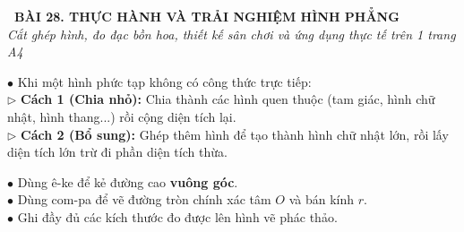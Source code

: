 \documentclass[14pt,a4paper,oneside]{extbook}
\begin{document}
\noindent
\begin{tcolorbox}[
  enhanced,
  colback=teal!8!white,
  colframe=teal!80!black,
  arc=3mm,
  boxrule=1.1pt,
  width=\linewidth,
  halign=center,
  top=2.2mm, bottom=2.2mm,
  left=3mm, right=3mm,
  drop fuzzy shadow
]
  {\large\bfseries\color{teal!95!black}\faBookmark\ BÀI 28. THỰC HÀNH VÀ TRẢI NGHIỆM HÌNH PHẲNG}\\[2pt]
  {\scriptsize\color{black!75}\itshape Cắt ghép hình, đo đạc bồn hoa, thiết kế sân chơi và ứng dụng thực tế trên 1 trang A4}
\end{tcolorbox}

\vspace{3.2mm}
\noindent
\begin{minipage}[t]{0.54\textwidth}
  \begin{tcolorbox}[
    enhanced,
    title={\footnotesize\bfseries\color{white}\faScissors\ 1. Nguyên lý phân chia và bảo toàn diện tích},
    colback=blue!2!white,
    colframe=blue!75!black,
    arc=2.5mm, boxrule=0.8pt, top=1.8mm, bottom=1.8mm, left=2.2mm, right=2.2mm
  ]
    \footnotesize
    $\bullet$ Khi một hình phức tạp không có công thức trực tiếp:\\
    $\triangleright$ \textbf{Cách 1 (Chia nhỏ):} Chia thành các hình quen thuộc (tam giác, hình chữ nhật, hình thang...) rồi cộng diện tích lại.\\
    $\triangleright$ \textbf{Cách 2 (Bổ sung):} Ghép thêm hình để tạo thành hình chữ nhật lớn, rồi lấy diện tích lớn trừ đi phần diện tích thừa.
  \end{tcolorbox}
\end{minipage}%
\hfill
\begin{minipage}[t]{0.44\textwidth}
  \begin{tcolorbox}[
    enhanced,
    title={\footnotesize\bfseries\color{white}\faPencilSquareO\ 2. Kỹ năng vẽ hình chuẩn},
    colback=teal!2!white,
    colframe=teal!75!black,
    arc=2.5mm, boxrule=0.8pt, top=1.8mm, bottom=1.8mm, left=2mm, right=2mm
  ]
    \footnotesize
    $\bullet$ Dùng ê-ke để kẻ đường cao \textbf{vuông góc}.\\
    $\bullet$ Dùng com-pa để vẽ đường tròn chính xác tâm $O$ và bán kính $r$.\\
    $\bullet$ Ghi đầy đủ các kích thước đo được lên hình vẽ phác thảo.
  \end{tcolorbox}
\end{minipage}

\vspace{3mm}
\end{document}

